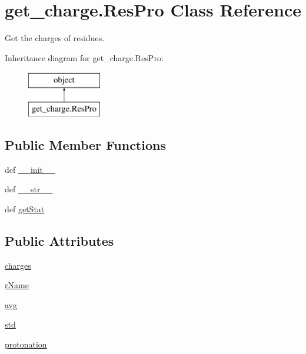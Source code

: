\hypertarget{classget__charge_1_1_res_pro}{\section{get\-\_\-charge.\-Res\-Pro Class Reference}
\label{classget__charge_1_1_res_pro}
}


Get the charges of residues.  


Inheritance diagram for get\-\_\-charge.\-Res\-Pro\-:\begin{figure}[H]
\begin{center}
\leavevmode
\includegraphics[height=2.000000cm]{classget__charge_1_1_res_pro}
\end{center}
\end{figure}
\subsection*{Public Member Functions}
\begin{DoxyCompactItemize}
\item 
def \hyperlink{classget__charge_1_1_res_pro_a0a1c975f9bb2ba10abe7c9f4be965b04}{\-\_\-\-\_\-init\-\_\-\-\_\-}
\item 
def \hyperlink{classget__charge_1_1_res_pro_aa0b4bed643d3d032ed97c89f5426cfef}{\-\_\-\-\_\-str\-\_\-\-\_\-}
\item 
def \hyperlink{classget__charge_1_1_res_pro_a2ff72116a5eec8e96c3085269e265250}{get\-Stat}
\end{DoxyCompactItemize}
\subsection*{Public Attributes}
\begin{DoxyCompactItemize}
\item 
\hyperlink{classget__charge_1_1_res_pro_aaa9de483c5f88fe49fd682dd1b8a62e7}{charges}
\item 
\hyperlink{classget__charge_1_1_res_pro_af00fc3f5bae5c3d3734b384b2d2c466d}{r\-Name}
\item 
\hyperlink{classget__charge_1_1_res_pro_a19649fb10b2d365eddf247107e39b0d0}{avg}
\item 
\hyperlink{classget__charge_1_1_res_pro_afad79b4ab35532abe9a7d305725fb0bc}{std}
\item 
\hyperlink{classget__charge_1_1_res_pro_a0f70c65e6cef508bcd63147ad7265fee}{protonation}
\end{DoxyCompactItemize}
